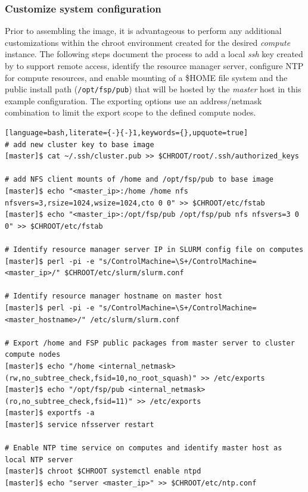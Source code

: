 \documentclass[letterpaper]{article}
\begin{document}

\subsubsection{Customize system configuration} \label{sec:master_customization}

Prior to assembling the image, it is advantageous to perform any additional
customizations within the chroot environment created for the desired {\em
  compute} instance. The following steps document the process to add a local
{\em ssh} key created by \Warewulf{} to support remote access, identify the
resource manager server, configure NTP for compute resources, and enable \NFS{}
mounting of a \$HOME file system and the public \FSP{} install path
(\texttt{/opt/fsp/pub}) that will be hosted by the {\em master} host in this
example configuration.  The \NFS{} exporting options use an address/netmask
combination to limit the export scope to the defined compute nodes.


\begin{lstlisting}[language=bash,literate={-}{-}1,keywords={},upquote=true]
# add new cluster key to base image
[master]$ cat ~/.ssh/cluster.pub >> $CHROOT/root/.ssh/authorized_keys

# add NFS client mounts of /home and /opt/fsp/pub to base image
[master]$ echo "<master_ip>:/home /home nfs nfsvers=3,rsize=1024,wsize=1024,cto 0 0" >> $CHROOT/etc/fstab
[master]$ echo "<master_ip>:/opt/fsp/pub /opt/fsp/pub nfs nfsvers=3 0 0" >> $CHROOT/etc/fstab

# Identify resource manager server IP in SLURM config file on computes
[master]$ perl -pi -e "s/ControlMachine=\S+/ControlMachine=<master_ip>/" $CHROOT/etc/slurm/slurm.conf

# Identify resource manager hostname on master host
[master]$ perl -pi -e "s/ControlMachine=\S+/ControlMachine=<master_hostname>/" /etc/slurm/slurm.conf

# Export /home and FSP public packages from master server to cluster compute nodes
[master]$ echo "/home <internal_netmask>(rw,no_subtree_check,fsid=10,no_root_squash)" >> /etc/exports
[master]$ echo "/opt/fsp/pub <internal_netmask>(ro,no_subtree_check,fsid=11)" >> /etc/exports
[master]$ exportfs -a
[master]$ service nfsserver restart

# Enable NTP time service on computes and identify master host as local NTP server
[master]$ chroot $CHROOT systemctl enable ntpd
[master]$ echo "server <master_ip>" >> $CHROOT/etc/ntp.conf
\end{lstlisting}
\end{document}
